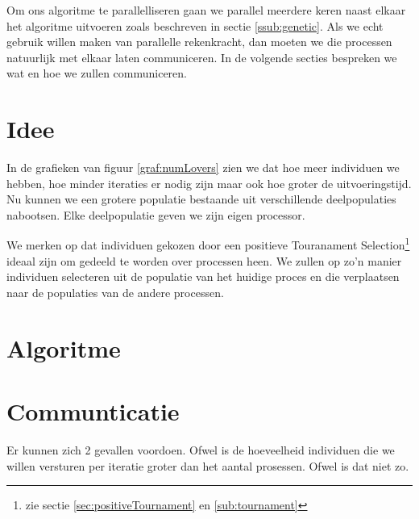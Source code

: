 

Om ons algoritme te parallelliseren gaan we parallel meerdere keren naast elkaar het algoritme uitvoeren zoals beschreven in sectie \ref{ssub:genetic}. Als we echt gebruik willen maken van parallelle rekenkracht, dan moeten we die processen natuurlijk met elkaar laten communiceren.   In de volgende secties bespreken we wat en hoe we zullen communiceren.
\section{Idee}
\label{sec:idee}
In de grafieken van figuur \ref{graf:numLovers} zien we dat hoe meer individuen we hebben, hoe minder iteraties er nodig zijn maar ook hoe groter de uitvoeringstijd. Nu kunnen we een grotere populatie bestaande uit verschillende deelpopulaties nabootsen. Elke deelpopulatie geven we zijn eigen processor.  

We merken op dat individuen gekozen door een positieve Touranament Selection\footnote{zie sectie \ref{sec:positiveTournament} en \ref{sub:tournament}} ideaal zijn om gedeeld te worden over processen heen. We zullen op zo'n manier individuen selecteren uit de populatie van het huidige proces en die verplaatsen naar de populaties van de andere processen. 

\section{Algoritme}


\section{Communticatie}
Er kunnen zich 2 gevallen voordoen. Ofwel is de hoeveelheid individuen die we willen versturen per iteratie groter dan het aantal prosessen. Ofwel is dat niet zo.

